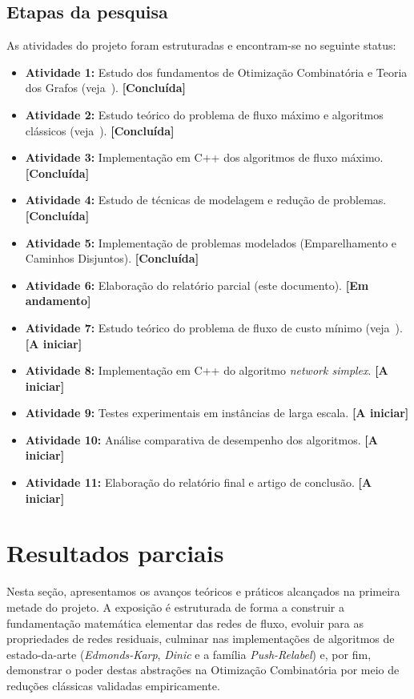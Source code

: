 \documentclass[12pt,a4paper]{article}
\begin{document}
\subsection{Etapas da pesquisa}
As atividades do projeto foram estruturadas e encontram-se no seguinte status:
\begin{itemize}
    \item \textbf{Atividade 1:} Estudo dos fundamentos de Otimização Combinatória e Teoria dos Grafos (veja~\cite{cook1998combinatorial}). \textbf{[Concluída]}
    \item \textbf{Atividade 2:} Estudo teórico do problema de fluxo máximo e algoritmos clássicos (veja~\cite{ford1956maximal, edmonds1972theoretical, dinic1970algorithm, goldberg1988new}). \textbf{[Concluída]}
    \item \textbf{Atividade 3:} Implementação em C++ dos algoritmos de fluxo máximo. \textbf{[Concluída]}
    \item \textbf{Atividade 4:} Estudo de técnicas de modelagem e redução de problemas. \textbf{[Concluída]}
    \item \textbf{Atividade 5:} Implementação de problemas modelados (Emparelhamento e Caminhos Disjuntos). \textbf{[Concluída]}
    \item \textbf{Atividade 6:} Elaboração do relatório parcial (este documento). \textbf{[Em andamento]}
    \item \textbf{Atividade 7:} Estudo teórico do problema de fluxo de custo mínimo (veja~\cite{cook1998combinatorial}). \textbf{[A iniciar]}
    \item \textbf{Atividade 8:} Implementação em C++ do algoritmo \textit{network simplex}. \textbf{[A iniciar]}
    \item \textbf{Atividade 9:} Testes experimentais em instâncias de larga escala. \textbf{[A iniciar]}
    \item \textbf{Atividade 10:} Análise comparativa de desempenho dos algoritmos. \textbf{[A iniciar]}
    \item \textbf{Atividade 11:} Elaboração do relatório final e artigo de conclusão. \textbf{[A iniciar]}
\end{itemize}

\section{Resultados parciais}

Nesta seção, apresentamos os avanços teóricos e práticos alcançados na primeira metade do projeto. A exposição é estruturada de forma a construir a fundamentação matemática elementar das redes de fluxo, evoluir para as propriedades de redes residuais, culminar nas implementações de algoritmos de estado-da-arte (\textit{Edmonds-Karp}, \textit{Dinic} e a família \textit{Push-Relabel}) e, por fim, demonstrar o poder destas abstrações na Otimização Combinatória por meio de reduções clássicas validadas empiricamente.
\end{document}
